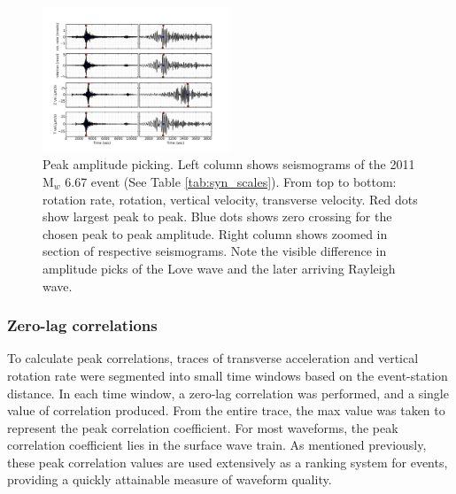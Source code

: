 \documentclass{gji}
\begin{document}
\begin{figure}
\centerline{\includegraphics[width=0.5\textwidth]{amp_picking_update-2011-09-16}}
\caption{Peak amplitude picking. Left column shows seismograms of the 2011 M$_w$ 6.67 event (See Table \ref{tab:syn_scales}). From top to bottom: rotation rate, rotation, vertical velocity, transverse velocity. Red dots show largest peak to peak. Blue dots shows zero crossing for the chosen peak to peak amplitude. \newline Right column shows zoomed in section of respective seismograms. Note the visible difference in amplitude picks of the Love wave and the later arriving Rayleigh wave.}
\label{fig:obswav}
\end{figure}


\subsubsection{Zero-lag correlations}
To calculate peak correlations, traces of transverse acceleration and vertical rotation rate were segmented into small time windows based on the event-station distance. In each time window, a zero-lag correlation was performed, and a single value of correlation produced. From the entire trace, the max value was taken to represent the peak correlation coefficient. For most waveforms, the peak correlation coefficient lies in the surface wave train. As mentioned previously, these peak correlation values are used extensively as a ranking system for events, providing a quickly attainable measure of waveform quality.
\end{document}
